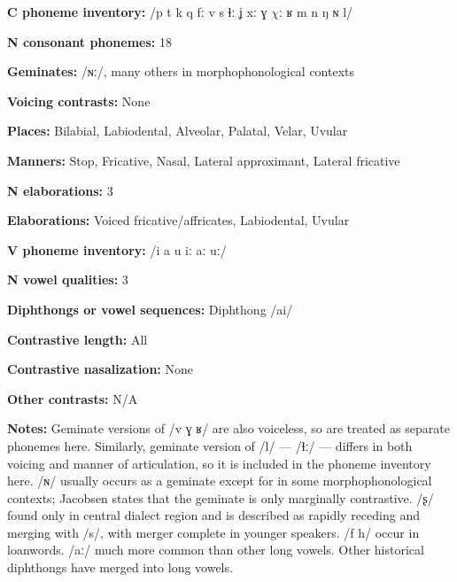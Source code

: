 \textbf{C phoneme inventory:} /p t k q fː v s ɬː ʝ xː ɣ $\chi ː$ ʁ m n ŋ ɴ l/



\textbf{N consonant phonemes:} 18



\textbf{Geminates:} /ɴː/, many others in morphophonological contexts



\textbf{Voicing contrasts:} None



\textbf{Places:} Bilabial, Labiodental, Alveolar, Palatal, Velar, Uvular



\textbf{Manners:} Stop, Fricative, Nasal, Lateral approximant, Lateral fricative 



\textbf{N elaborations:} 3



\textbf{Elaborations:} Voiced fricative/affricates, Labiodental, Uvular



\textbf{V phoneme inventory:} /i a u iː aː uː/



\textbf{N vowel qualities:} 3



\textbf{Diphthongs or vowel sequences:} Diphthong /ai/



\textbf{Contrastive length:} All



\textbf{Contrastive nasalization:} None



\textbf{Other contrasts:} N/A



\textbf{Notes:} Geminate versions of /v ɣ ʁ/ are also voiceless, so are treated as separate phonemes here. Similarly, geminate version of /l/ — /ɬː/ — differs in both voicing and manner of articulation, so it is included in the phoneme inventory here. /ɴ/ usually occurs as a geminate except for in some morphophonological contexts; Jacobsen states that the geminate is only marginally contrastive. /ʂ/ found only in central dialect region and is described as rapidly receding and merging with /s/, with merger complete in younger speakers. /f h/ occur in loanwords. /aː/ much more common than other long vowels. Other historical diphthongs have merged into long vowels.



